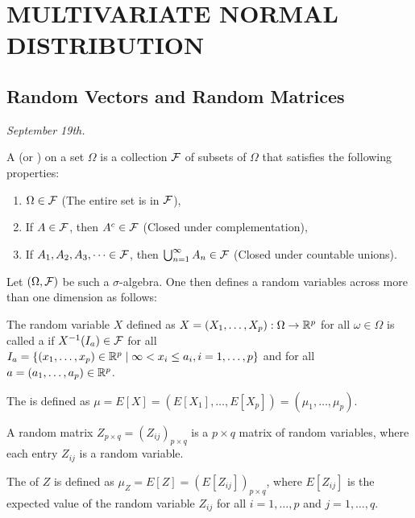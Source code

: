 \chapter{MULTIVARIATE NORMAL DISTRIBUTION}

\section{Random Vectors and Random Matrices}

\textit{September 19th.}

\begin{definition}    
    A  (or ) on a set $ \Omega $ is a collection $\mathcal{F}$ of subsets of $\Omega$ that satisfies the following properties:
    \begin{enumerate}
        \item $\Omega \in \mathcal{F} $ (The entire set is in $ \mathcal{F} $),
        \item If $A \in \mathcal{F}$, then $A^c \in \mathcal{F}$ (Closed under complementation),
        \item If $A_1, A_2, A_3, \dots \in \mathcal{F} $, then $ \bigcup_{n=1}^\infty A_n \in \mathcal{F} $ (Closed under countable unions).
    \end{enumerate}
\end{definition}

Let $(\Omega, \mathcal{F})$ be such a $\sigma$-algebra. One then defines a random variables across more than one dimension as follows:
\begin{definition}
    The random variable $X$ defined as $X = (X_{1},\ldots,X_{p}):\Omega \to \mathbb{R}^{p}$ for all $\omega \in \Omega$ is called a  if $X^{-1}(I_{a}) \in \mathcal{F}$ for all $I_{a} = \{(x_{1},\ldots,x_{p}) \in \mathbb{R}^{p} \mid \infty < x_{i} \leq a_{i}, i = 1,\ldots,p\}$ and for all $a = (a_{1},\ldots,a_{p}) \in \mathbb{R}^{p}$.

    The  is defined as $\mu = E[X] = (E[X_{1}],\ldots,E[X_{p}]) = (\mu_{1},\ldots,\mu_{p})$.
\end{definition}

\begin{definition}
    A random matrix $Z_{p \times q} = (Z_{ij})_{p \times q}$ is a $p \times q$ matrix of random variables, where each entry $Z_{ij}$ is a random variable.

    The  of $Z$ is defined as $\mu_Z = E[Z] = (E[Z_{ij}])_{p \times q}$, where $E[Z_{ij}]$ is the expected value of the random variable $Z_{ij}$ for all $i = 1, \ldots, p$ and $j = 1, \ldots, q$.
\end{definition}

